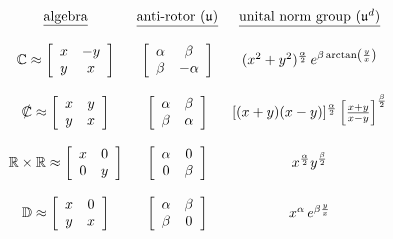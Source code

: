 \documentclass{amsart}
\theoremstyle{definition}
\numberwithin{theorem}{section}
\numberwithin{equation}{section}
\begin{document}
\hspace{.7cm}$ \begin{array}{cccccccc} 
\mbox{\underline{algebra}} & \mbox{\underline{anti-rotor $(\mathfrak{u})$}} & \mbox{\underline{unital norm group ($\mathfrak{u}^d$)}}  \\ 
\\
\mathbb{C} \approx \left[\begin{array}{ccc}
x  & -y    \\
 y & x \\   
\end{array}\right]   & \left[\begin{array}{ccc}
\alpha  & \beta    \\
 \beta & -\alpha \\   
\end{array}\right]  & (x^2+y^2)^{\frac{\alpha}{2}} \,e^{\beta\,{\rm arctan}\left(\frac{y}{x}\right)}  \\ \\
\slashed{\mathbb{C}} \approx \left[\begin{array}{ccc}
x  & y    \\
 y & x \\   
\end{array}\right]   & \left[\begin{array}{ccc}
\alpha  & \beta    \\
 \beta & \alpha \\   
\end{array}\right]  & [(x+y)(x-y)]^{\frac{\alpha}{2}} \left[\frac{x+y}{x-y}\right]^{\frac{\beta}{2}}  \\ \\ 
\mathbb{R}\times\mathbb{R} \approx \left[\begin{array}{ccc}
x  & 0    \\
 0 & y \\   
\end{array}\right]   & \left[\begin{array}{ccc}
\alpha  & 0    \\
 0 & \beta \\   
\end{array}\right]  & x^\frac{\alpha}{2} y^\frac{\beta}{2}  \\ \\
\mathbb{D} \approx \left[\begin{array}{ccc}
x  & 0    \\
 y & x \\   
\end{array}\right]   & \left[\begin{array}{ccc}
\alpha  & \beta    \\
 \beta & 0 \\   
\end{array}\right]  & x^\alpha\,e^{\beta \frac{y}{x}}  \\ \\
\end{array} $
\end{document}
